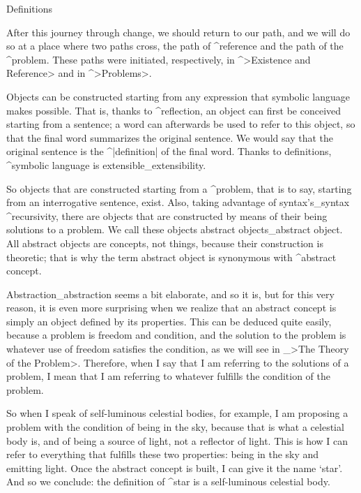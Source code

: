 \Section Definitions

After this journey through change, we should return to our path, and we
will do so at a place where two paths cross, the path of ^{reference}
and the path of the ^{problem}. These paths were initiated,
respectively, in ^>Existence and Reference> and in ^>Problems>.

Objects can be constructed starting from any expression that symbolic
language makes possible. That is, thanks to ^{reflection}, an object can
first be conceived starting from a sentence; a word can afterwards be
used to refer to this object, so that the final word summarizes the
original sentence. We would say that the original sentence is the
^|definition| of the final word. Thanks to definitions, ^{symbolic
language} is extensible_{extensibility}.

So objects that are constructed starting from a ^{problem}, that is to
say, starting from an interrogative sentence, exist. Also, taking
advantage of syntax's_{syntax} ^{recursivity}, there are objects that
are constructed by means of their being solutions to a problem. We call
these objects abstract objects_{abstract object}. All abstract objects
are concepts, not things, because their construction is theoretic; that
is why the term abstract object is synonymous with ^{abstract concept}.

Abstraction_{abstraction} seems a bit elaborate, and so it is, but for
this very reason, it is even more surprising when we realize that an
abstract concept is simply an object defined by its properties. This can
be deduced quite easily, because a problem is freedom and condition, and
the solution to the problem is whatever use of freedom satisfies the
condition, as we will see in _>The Theory of the Problem>. Therefore,
when I say that I am referring to the solutions of a problem, I mean
that I am referring to whatever fulfills the condition of the problem.

So when I speak of self-luminous celestial bodies, for example, I am
proposing a problem with the condition of being in the sky, because that
is what a celestial body is, and of being a source of light, not a
reflector of light. This is how I can refer to everything that fulfills
these two properties: being in the sky and emitting light. Once the
abstract concept is built, I can give it the name `star'. And so we
conclude: the definition of ^{star} is a self-luminous celestial body.

